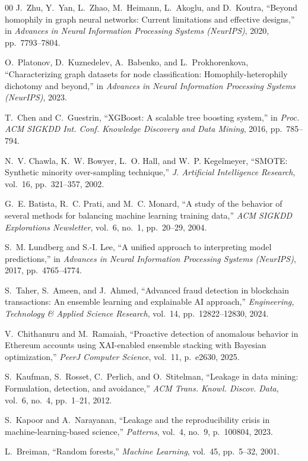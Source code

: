 \begin{thebibliography}{00}
 J.~Zhu, Y.~Yan, L.~Zhao, M.~Heimann, L.~Akoglu, and D.~Koutra, ``Beyond homophily in graph neural networks: Current limitations and effective designs,'' in \emph{Advances in Neural Information Processing Systems (NeurIPS)}, 2020, pp.~7793--7804.

 O.~Platonov, D.~Kuznedelev, A.~Babenko, and L.~Prokhorenkova, ``Characterizing graph datasets for node classification: Homophily-heterophily dichotomy and beyond,'' in \emph{Advances in Neural Information Processing Systems (NeurIPS)}, 2023.

 T.~Chen and C.~Guestrin, ``XGBoost: A scalable tree boosting system,'' in \emph{Proc. ACM SIGKDD Int. Conf. Knowledge Discovery and Data Mining}, 2016, pp.~785--794.

 N.~V. Chawla, K.~W. Bowyer, L.~O. Hall, and W.~P. Kegelmeyer, ``SMOTE: Synthetic minority over-sampling technique,'' \emph{J. Artificial Intelligence Research}, vol.~16, pp.~321--357, 2002.

 G.~E. Batista, R.~C. Prati, and M.~C. Monard, ``A study of the behavior of several methods for balancing machine learning training data,'' \emph{ACM SIGKDD Explorations Newsletter}, vol.~6, no.~1, pp.~20--29, 2004.

 S.~M. Lundberg and S.-I. Lee, ``A unified approach to interpreting model predictions,'' in \emph{Advances in Neural Information Processing Systems (NeurIPS)}, 2017, pp.~4765--4774.

 S.~Taher, S.~Ameen, and J.~Ahmed, ``Advanced fraud detection in blockchain transactions: An ensemble learning and explainable AI approach,'' \emph{Engineering, Technology \& Applied Science Research}, vol.~14, pp.~12822--12830, 2024.

 V.~Chithanuru and M.~Ramaiah, ``Proactive detection of anomalous behavior in Ethereum accounts using XAI-enabled ensemble stacking with Bayesian optimization,'' \emph{PeerJ Computer Science}, vol.~11, p.~e2630, 2025.

 S.~Kaufman, S.~Rosset, C.~Perlich, and O.~Stitelman, ``Leakage in data mining: Formulation, detection, and avoidance,'' \emph{ACM Trans. Knowl. Discov. Data}, vol.~6, no.~4, pp.~1--21, 2012.

 S.~Kapoor and A.~Narayanan, ``Leakage and the reproducibility crisis in machine-learning-based science,'' \emph{Patterns}, vol.~4, no.~9, p.~100804, 2023.

 L.~Breiman, ``Random forests,'' \emph{Machine Learning}, vol.~45, pp.~5--32, 2001.

\end{thebibliography}
